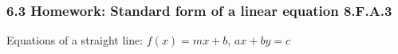 

\fancyhead[LE]{\thepage}



\subsubsection*{6.3 Homework: Standard form of a linear equation \hfill 8.F.A.3}
Equations of a straight line: $f(x)=mx+b$, $ax+by=c$ \par
